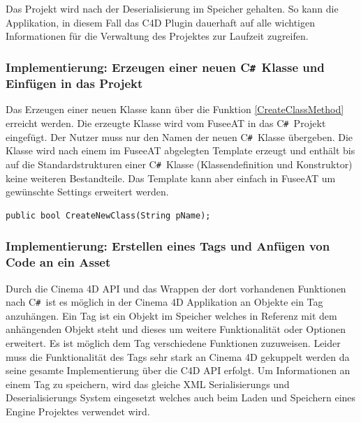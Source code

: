 \documentclass[pagesize, paper=a4, fontsize=12pt, titlepage=true, headings=small, headnosepline, abstractoff, liststotoc, nochapterprefix, plainheadsepline, twoside]{scrreprt}
\newcommand{\CSS}{C\texttt{\# }}
\begin{document}
Das Projekt wird nach der Deserialisierung im Speicher gehalten. So kann die Applikation, in diesem Fall das C4D Plugin dauerhaft auf alle wichtigen Informationen für die Verwaltung des Projektes zur Laufzeit zugreifen.

\subsubsection{Implementierung: Erzeugen einer neuen \CSS Klasse und Einfügen in das Projekt}
Das Erzeugen einer neuen Klasse kann über die Funktion \ref{CreateClassMethod} erreicht werden. Die erzeugte Klasse wird vom FuseeAT in das \CSS Projekt eingefügt. Der Nutzer muss nur den Namen der neuen \CSS Klasse übergeben. Die Klasse wird nach einem im FuseeAT abgelegten Template erzeugt und enthält bis auf die Standardstrukturen einer \CSS Klasse (Klassendefinition und Konstruktor) keine weiteren Bestandteile. Das Template kann aber einfach in FuseeAT um gewünschte Settings erweitert werden.
\begin{lstlisting}[label=CreateClassMethod, caption=Funktion zum Erstellen einer neuen Klasse im \CSS Projekt.]
	public bool CreateNewClass(String pName);
\end{lstlisting}

\subsubsection{Implementierung: Erstellen eines Tags und Anfügen von Code an ein Asset}
Durch die Cinema 4D API und das Wrappen der dort vorhandenen Funktionen nach \CSS ist es möglich in der Cinema 4D Applikation an Objekte ein Tag anzuhängen. Ein Tag ist ein Objekt im Speicher welches in Referenz mit dem anhängenden Objekt steht und dieses um weitere Funktionalität oder Optionen erweitert. Es ist möglich dem Tag verschiedene Funktionen zuzuweisen. Leider muss die Funktionalität des Tags sehr stark an Cinema 4D gekuppelt werden da seine gesamte Implementierung über die C4D API erfolgt.
Um Informationen an einem Tag zu speichern, wird das gleiche XML Serialisierungs und Deserialisierungs System eingesetzt welches auch beim Laden und Speichern eines Engine Projektes verwendet wird.
\end{document}
